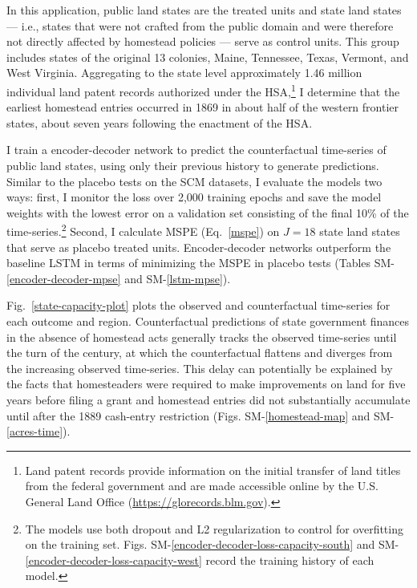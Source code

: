 \documentclass[hidelinks,12pt]{article}
\begin{document}
In this application, public land states are the treated units and state land states --- i.e., states that were not crafted from the public domain and were therefore not directly affected by homestead policies --- serve as control units. This group includes states of the original 13 colonies, Maine, Tennessee, Texas, Vermont, and West Virginia. Aggregating to the state level approximately 1.46 million individual land patent records authorized under the HSA,\footnote{Land patent records provide information on the initial transfer of land titles from the federal government and are made accessible online by the U.S. General Land Office (\url{https://glorecords.blm.gov}).} I determine that the earliest homestead entries occurred in 1869 in about half of the western frontier states, about seven years following the enactment of the HSA.


I train a encoder-decoder network to predict the counterfactual time-series of public land states, using only their previous history to generate predictions. Similar to the placebo tests on the SCM datasets, I evaluate the models two ways: first, I monitor the loss over 2,000 training epochs and save the model weights with the lowest error on a validation set consisting of the final 10\% of the time-series.\footnote{The models use both dropout and L2 regularization to control for overfitting on the training set. Figs. SM-\ref{encoder-decoder-loss-capacity-south} and SM-\ref{encoder-decoder-loss-capacity-west} record the training history of each model.} Second, I calculate MSPE (Eq.~\ref{mspe}) on $J=18$ state land states that serve as placebo treated units. Encoder-decoder networks outperform the baseline LSTM in terms of minimizing the MSPE in placebo tests (Tables SM-\ref{encoder-decoder-mpse} and SM-\ref{lstm-mpse}).

Fig.~\ref{state-capacity-plot} plots the observed and counterfactual time-series for each outcome and region. Counterfactual predictions of state government finances in the absence of homestead acts generally tracks the observed time-series until the turn of the century, at which the counterfactual flattens and diverges from the increasing observed time-series. This delay can potentially be explained by the facts that homesteaders were required to make improvements on land for five years before filing a grant and homestead entries did not substantially accumulate until after the 1889 cash-entry restriction (Figs. SM-\ref{homestead-map} and SM-\ref{acres-time}). 
\end{document}
